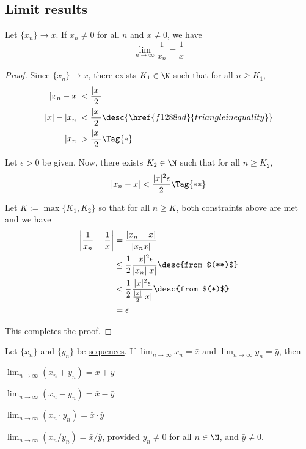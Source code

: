 \subsection{Limit results}\label{e118ddb}

\label{cbd2c3c}

Let $\{x_n\}\to x$. If $x_n\neq0$ for all $n$ and $x\neq0$, we have
$$
  \lim_{n\to\infty}\frac1{x_n}=\frac1x
$$

\begin{proof}
  \href{e565120}{Since} $\{x_n\}\to x$, there exists $K_1\in\N$ such that for
  all $n\geq K_1$,
  \begin{align*}
    |x_n-x|   &<\frac{|x|}2                                             \\
    |x|-|x_n| &<\frac{|x|}{2}\desc{\href{f1288ad}{triangle inequality}} \\
    |x_n|     &>\frac{|x|}{2}\Tag{*}
  \end{align*}

  Let $\epsilon>0$ be given. Now, there exists $K_2\in\N$ such that for all
  $n\geq K_2$,
  \begin{equation*}
    |x_n-x|<\frac{|x|^2\epsilon}2\Tag{**}
  \end{equation*}

  Let $K:=\max\{K_1,K_2\}$ so that for all $n\geq K$, both constraints above
  are met and we have
  \begin{align*}
    \biggl|\frac1{x_n}-\frac1x\biggr|
     &=\frac{|x_n-x|}{|x_nx|}                                         \\
     &\leq\frac12\frac{|x|^2\epsilon}{|x_n||x|}\desc{from $(**)$}     \\
     &<\frac12\frac{|x|^2\epsilon}{\frac{|x|}{2}|x|}\desc{from $(*)$} \\
     &=\epsilon
  \end{align*}

  This completes the proof.
\end{proof}

\label{d13a5e7}

Let $\{x_n\}$ and $\{y_n\}$ be \href{b5fa0e4}{sequences}. If
$\displaystyle\lim_{n\to\infty}x_n=\bar x$ and
$\displaystyle\lim_{n\to\infty}y_n=\bar y$, then

\begin{enumerati}
  \def\l{\displaystyle\lim_{n\to\infty}}
  \item $\l(x_n+y_n)=\bar x+\bar y$
  \item $\l(x_n-y_n)=\bar x-\bar y$
  \item $\l(x_n\cdot y_n)=\bar x\cdot\bar y$
  \item $\l(x_n/y_n)=\bar x/\bar y$, provided $y_n\neq0$ for all $n\in\N$, and
  $\bar y\neq0$.
\end{enumerati}


